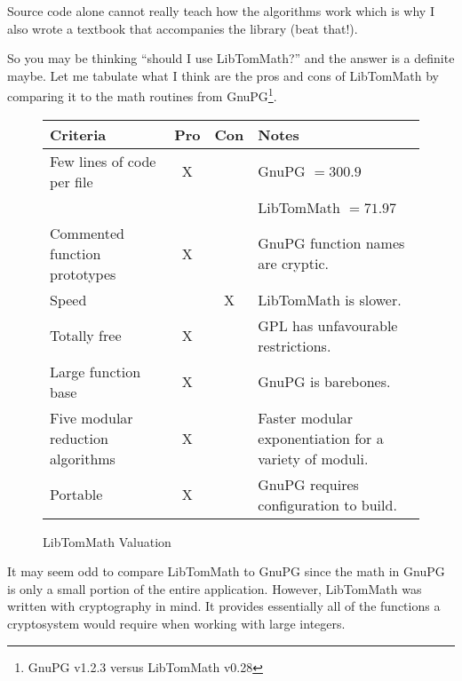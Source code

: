 \documentclass[synpaper]{book}
\begin{document}
Source code alone cannot really teach how the algorithms work which is why I also wrote a textbook
that accompanies the library (beat that!).

So you may be thinking ``should I use LibTomMath?'' and the answer is a definite maybe.  Let me
tabulate what I think are the pros and cons of LibTomMath by comparing it to the math routines from
GnuPG\footnote{GnuPG v1.2.3 versus LibTomMath v0.28}.

\newpage\begin{figure}[h]
  \begin{small}
    \begin{center}
      \begin{tabular}{|p{4.5cm}|c|c|p{4.5cm}|}
        \hline \textbf{Criteria}                 & \textbf{Pro} & \textbf{Con} & \textbf{Notes}
        \\
        \hline Few lines of code per file        & X            &              & GnuPG $ = 300.9$
        \\
                                                 &              &              & LibTomMath $ =
          71.97$\hfill
        \\
        \hline Commented function prototypes     & X            &              & GnuPG function
        names are cryptic.
        \\
        \hline Speed                             &              & X            & LibTomMath is
        slower.
        \\
        \hline Totally free                      & X            &              & GPL has
        unfavourable restrictions.
        \\
        \hline Large function base               & X            &              & GnuPG is
        barebones.
        \\
        \hline Five modular reduction algorithms & X            &              & Faster modular
        exponentiation for a variety of
        moduli.
        \\
        \hline Portable                          & X            &              & GnuPG requires
        configuration to build.
        \\
        \hline
      \end{tabular}
    \end{center}
  \end{small}
  \caption{LibTomMath Valuation}
\end{figure}

It may seem odd to compare LibTomMath to GnuPG since the math in GnuPG is only a small portion of
the entire application. However, LibTomMath was written with cryptography in mind.  It provides
essentially all of the functions a cryptosystem would require when working with large integers.
\end{document}
